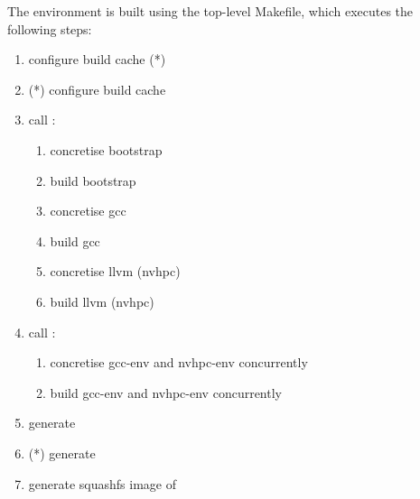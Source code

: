 The environment is built using the top-level Makefile, which executes the following steps:
\begin{enumerate}
    \item configure build cache (*)
    \item (*) configure build cache
    \item call :
    \begin{enumerate}
        \item concretise bootstrap
        \item build bootstrap
        \item concretise gcc
        \item build gcc
        \item concretise llvm (nvhpc)
        \item build llvm (nvhpc)
    \end{enumerate}
    \item call :
    \begin{enumerate}
        \item concretise gcc-env and nvhpc-env concurrently
        \item build gcc-env and nvhpc-env concurrently
    \end{enumerate}
    \item generate 
    \item (*) generate 
    \item generate squashfs image of 
\end{enumerate}


